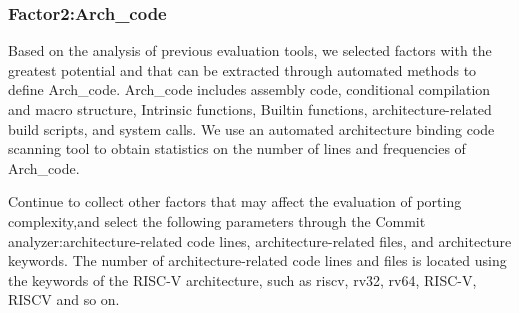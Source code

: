 \documentclass[sigconf,screen,review,anonymous]{acmart}
\begin{document}
\subsubsection{Factor2:Arch\_code}

Based on the analysis of previous evaluation tools, we selected factors with the greatest potential and that can be extracted through automated methods to define Arch\_code.
Arch\_code includes assembly code, conditional compilation and macro structure, Intrinsic functions, Builtin functions, architecture-related build scripts, and system calls.
We use an automated architecture binding code scanning tool to obtain statistics on the number of lines and frequencies of Arch\_code.

Continue to collect other factors that may affect the evaluation of porting complexity,and select the following parameters through the Commit analyzer:architecture-related code lines, architecture-related files, and architecture keywords.
The number of architecture-related code lines and files is located using the keywords of the RISC-V architecture, such as riscv, rv32, rv64, RISC-V, RISCV and so on.

\end{document}
